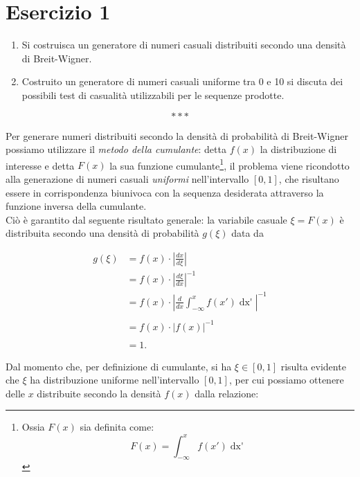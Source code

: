 \section{Esercizio 1}

\begin{enumerate}[label=\Alph*.]
	
	\item Si costruisca un generatore di numeri casuali distribuiti secondo una densità di Breit-Wigner.
	\item Costruito un generatore di  numeri casuali uniforme tra 0 e 10 si discuta dei possibili test di casualità utilizzabili per le sequenze prodotte.
		
\end{enumerate}

\[* * * \] \smallskip

\noindent Per generare numeri distribuiti secondo la densità di probabilità di Breit-Wigner possiamo utilizzare il \emph{metodo della cumulante}: detta $f(x)$ la distribuzione di interesse e detta $F(x) $ la sua funzione cumulante\footnote{Ossia $F(x)$ sia definita come: $$ F(x) = \int_{-\infty}^{x} f(x')\mathop{dx'} $$}, il problema viene ricondotto alla generazione di numeri casuali \emph{uniformi} nell'intervallo $[0,1]$, che risultano essere in corrispondenza biunivoca con la sequenza desiderata attraverso la funzione inversa della cumulante.\\

\noindent Ciò è garantito dal seguente risultato generale: la variabile casuale $\xi = F(x)$ è distribuita secondo una densità di probabilità $g(\xi)$ data da


\begin{align*}
g(\xi) &= f(x) \cdot \left|\frac{dx}{d\xi}\right| \\ 
&=  f(x) \cdot \left|\frac{d\xi}{dx}\right|^{-1} \\ 
&=  f(x) \cdot \left|\frac{d}{dx}\int_{-\infty}^{x} f(x')\mathop{dx'}\right|^{-1} \\ \\
&= f(x) \cdot \left|f(x)\right|^{-1}  \\ \\
&= 1. 
\end{align*}

\noindent Dal momento che, per definizione di cumulante, si ha $ \xi  \in [0,1]$ risulta evidente che $\xi$ ha distribuzione uniforme nell'intervallo $[0,1]$, per cui possiamo ottenere delle $x$ distribuite secondo la densità $f(x)$ dalla relazione:


